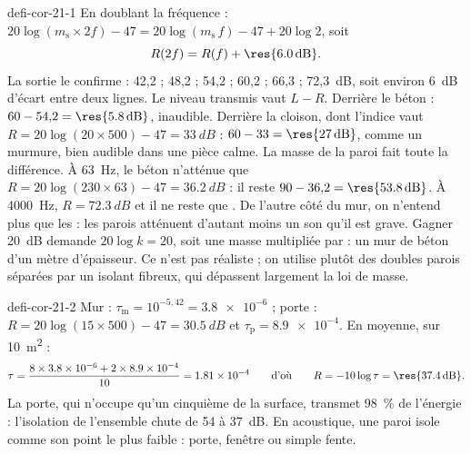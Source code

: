 \begin{blocEdition}{defi-cor-21-1}
En doublant la fréquence : $20\log(m_\mathrm{s}\times2f)-47=20\log(m_\mathrm{s}\,f)-47+20\log2$, soit
\[R(2f)=R(f)+\res{\qty{6,0}{dB}}.\]
La sortie le confirme : 42,2 ; 48,2 ; 54,2 ; 60,2 ; 66,3 ; 72,3~dB, soit environ \qty{6}{dB} d'écart entre deux lignes.
Le niveau transmis vaut $L-R$. Derrière le béton : $60-54{,}2=\res{\qty{5,8}{dB}}$, inaudible. Derrière la cloison, dont
l'indice vaut $R=20\log(20\times500)-47=\qty{33}{dB}$ : $60-33=\res{\qty{27}{dB}}$, comme un murmure, bien audible dans une
pièce calme. La masse de la paroi fait toute la différence.
À \qty{63}{Hz}, le béton n'atténue que $R=20\log(230\times63)-47=\qty{36,2}{dB}$ : il reste $90-36{,}2=\res{\qty{53,8}{dB}}$. À
\qty{4000}{Hz}, $R=\qty{72,3}{dB}$ et il ne reste que . De l'autre côté du mur, on n'entend plus que les
 : les parois atténuent d'autant moins un son qu'il est grave.
Gagner \qty{20}{dB} demande $20\log k=20$, soit une masse multipliée par  : un mur de béton d'un mètre
d'épaisseur. Ce n'est pas réaliste ; on utilise plutôt des doubles parois séparées par un isolant fibreux, qui
dépassent largement la loi de masse.
\end{blocEdition}

\begin{blocEdition}{defi-cor-21-2}
\label{figedition-defi-cor-21-2-1}
Mur : $\tau_\mathrm{m}=10^{-5{,}42}=\num{3.8e-6}$ ; porte : $R=20\log(15\times500)-47=\qty{30,5}{dB}$ et $\tau_\mathrm{p}=\num{8.9e-4}$. En
moyenne, sur \qty{10}{m^2} :
\[\tau=\frac{8\times\num{3.8e-6}+2\times\num{8.9e-4}}{10}=\num{1.81e-4}\qquad\text{d'où}\qquad R=-10\log\tau=\res{\qty{37,4}{dB}}.\]
La porte, qui n'occupe qu'un cinquième de la surface, transmet 98~\% de l'énergie : l'isolation de l'ensemble chute
de 54 à \qty{37}{dB}. En acoustique, une paroi isole comme son point le plus faible : porte, fenêtre ou simple fente.
\end{blocEdition}

